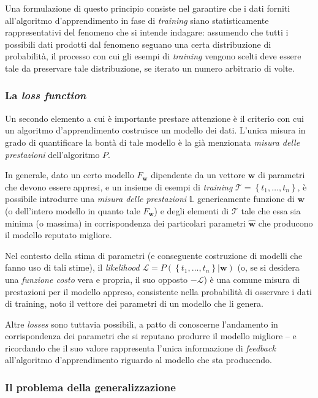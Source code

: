 \documentclass[a4paper, twoside]{article}
\begin{document}
Una formulazione di questo principio consiste nel garantire che i dati forniti all'algoritmo d'apprendimento in fase di \textit{training} siano statisticamente rappresentativi del fenomeno che si intende indagare: assumendo che tutti i possibili dati prodotti dal fenomeno seguano una certa distribuzione di probabilità, il processo con cui gli esempi di \textit{training} vengono scelti deve essere tale da preservare tale distribuzione, se iterato un numero arbitrario di volte.

\subsubsection{La \textit{loss function}}
Un secondo elemento a cui è importante prestare attenzione è il criterio con cui un algoritmo d'apprendimento costruisce un modello dei dati. L'unica misura in grado di quantificare la bontà di tale modello è la già menzionata \textit{misura delle prestazioni} dell'algoritmo $P$.

In generale, dato un certo modello $F_{\boldsymbol{w}}$ dipendente da un vettore $\boldsymbol{w}$ di parametri che devono essere appresi, e un insieme di esempi di \textit{training} $\mathcal{T} = \left\{ t_1, \dots, t_n \right\}$, è possibile introdurre una \textit{misura delle prestazioni} $\mathbb{L}$ genericamente funzione di $\boldsymbol{w}$ (o dell'intero modello in quanto tale $F_{\boldsymbol{w}}$) e degli elementi di $\mathcal{T}$ tale che essa sia minima (o massima) in corrispondenza dei particolari parametri $\boldsymbol{\hat{w}}$ che producono il modello reputato migliore.

Nel contesto della stima di parametri (e conseguente costruzione di modelli che fanno uso di tali stime), il \textit{likelihood} $\mathcal{L} = P\left(\left\{ t_1, \dots, t_n \right\}|\boldsymbol{w}\right)$ (o, se si desidera una \textit{funzione costo} vera e propria, il suo opposto $-\mathcal{L}$) è una comune misura di prestazioni per il modello appreso, consistente nella probabilità di osservare i dati di training, noto il vettore dei parametri di un modello che li genera.

Altre \textit{losses} sono tuttavia possibili, a patto di conoscerne l'andamento in corrispondenza dei parametri che si reputano produrre il modello migliore -- e ricordando che il suo valore rappresenta l'unica informazione di \textit{feedback} all'algoritmo d'apprendimento riguardo al modello che sta producendo.

\subsubsection{Il problema della generalizzazione}
\end{document}
